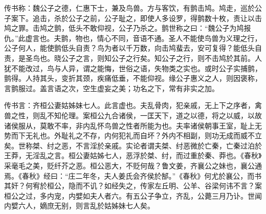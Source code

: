 \documentclass[]{article}
\begin{document}
传书称：魏公子之德，仁惠下士，兼及鸟兽。方与客饮，有鹯击鸠。鸠走，巡於公子案下。追击，杀於公子之前，公子耻之，即使人多设罗，得鹯数十枚，责让以击鸠之罪。击鸠之鹯，低头不敢仰视，公子乃杀之。鹯世称之曰：``魏公子为鸠报仇。''此虚言也。夫鹯，物也，情心不同，音语不通。圣人不能使鸟兽为义理之行，公子何人，能使鹯低头自责？鸟为者以千万数，向击鸠蜚去，安可复得？能低头自责，是圣鸟也。晓公子之言，则知公子之行矣。知公子之行，则不击鸠於其前。人犹不能改过，鸟与人异，谓之能悔，世俗之语，失物类之实也。或时公子实捕鹯，鹯得。人持其头，变折其颈，疾痛低垂，不能仰视。缘公子惠义之人，则因褒称，言鹯服过。盖言语之次，空生虚妄之美；功名之下，常有非实之加。

传书言：齐桓公妻姑姊妹七人。此言虚也。夫乱骨肉，犯亲戚，无上下之序者，禽兽之性，则乱不知伦理。案桓公九合诸侯，一匡天下，道之以德，将之以威，以故诸侯服从，莫敢不率，非内乱怀鸟兽之性者所能为也。夫率诸侯朝事王室，耻上无势而下无礼也。外耻礼之不存，内何犯礼而自坏？外内不相副，则功无成而威不立矣。世称桀、纣之恶，不言淫於亲戚。实论者谓夫桀、纣恶微於亡秦，亡秦过泊於王莽，无淫乱之言。桓公妻姑姊七人，恶浮於桀、纣，而过重於秦、莽也。《春秋》采毫毛之美，贬纤芥之恶。桓公恶大，不贬何哉？鲁文姜，齐襄公之妹也，襄公通焉。《春秋》经曰：``庄二年冬，夫人姜氏会齐侯於郜。''《春秋》何尤於襄公，而书其奸？何宥於桓公，隐而不讥？如经失之，传家左丘明、公羊、谷梁何讳不言？案桓公之过，多内宠，内嬖如夫人者六。有五公子争立，齐乱，公薨三月乃讣。世闻内嬖六人，嫡庶无别，则言乱於姑姊妹七人矣。
\end{document}
